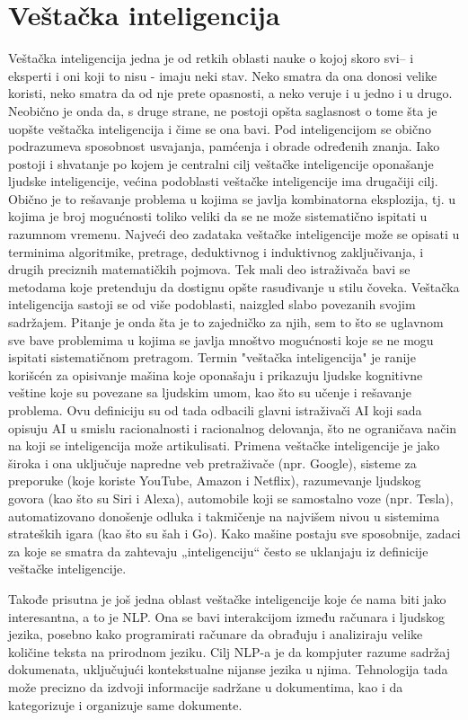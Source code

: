 \documentclass[a4paper]{article}
\begin{document}
\section{Veštačka inteligencija}
\label{Veštačka inteligencija}
Veštačka inteligencija jedna je od retkih oblasti nauke o kojoj skoro svi– i eksperti i oni koji to nisu - imaju neki stav. Neko smatra da ona donosi velike koristi, neko smatra da od nje prete opasnosti, a neko veruje i u jedno i u drugo. Neobično je onda da, s druge strane, ne postoji opšta saglasnost o tome šta je uopšte veštačka inteligencija i čime se ona bavi. Pod inteligencijom se obično podrazumeva sposobnost usvajanja, pamćenja i obrade određenih znanja. Iako postoji i shvatanje po kojem je centralni cilj veštačke inteligencije oponašanje ljudske inteligencije, većina podoblasti veštačke inteligencije ima drugačiji cilj. Obično je to rešavanje problema u kojima se javlja kombinatorna eksplozija, tj. u kojima je broj mogućnosti toliko veliki da se ne može sistematično ispitati u razumnom vremenu. Najveći deo zadataka veštačke inteligencije može se opisati u terminima algoritmike, pretrage, deduktivnog i induktivnog zaključivanja, i drugih preciznih matematičkih pojmova. Tek mali deo istraživača bavi se metodama koje pretenduju da dostignu opšte rasuđivanje u stilu čoveka. Veštačka inteligencija sastoji se od više podoblasti, naizgled slabo povezanih svojim sadržajem. Pitanje je onda šta je to zajedničko za njih, sem to što se uglavnom sve bave problemima u kojima se javlja mnoštvo mogućnosti koje se ne mogu ispitati sistematičnom pretragom. Termin "veštačka inteligencija" je ranije korišcén za opisivanje mašina koje oponašaju i prikazuju ljudske kognitivne veštine koje su povezane sa ljudskim umom, kao što su učenje i rešavanje problema. Ovu definiciju su od tada odbacili glavni istraživači AI koji sada opisuju AI u smislu racionalnosti i racionalnog delovanja, što ne ograničava način na koji se inteligencija može artikulisati.
\newpage
Primena veštačke inteligencije je jako široka i ona uključuje napredne veb pretraživače (npr. Google), sisteme za preporuke (koje koriste YouTube, Amazon i Netflix), razumevanje ljudskog govora (kao što su Siri i Alexa), automobile koji se samostalno voze (npr. Tesla), automatizovano donošenje odluka i takmičenje na najvišem nivou u sistemima strateških igara (kao što su šah i Go). Kako mašine postaju sve sposobnije, zadaci za koje se smatra da zahtevaju „inteligenciju“ često se uklanjaju iz definicije veštačke inteligencije.

Takođe prisutna je još jedna oblast veštačke inteligencije koje će nama biti jako interesantna, a to je NLP. Ona se bavi interakcijom između računara i ljudskog jezika, posebno kako programirati računare da obrađuju i analiziraju velike količine teksta na prirodnom jeziku. Cilj NLP-a je da kompjuter razume sadržaj dokumenata, uključujući kontekstualne nijanse jezika u njima. Tehnologija tada može precizno da izdvoji informacije  sadržane u dokumentima, kao i da kategorizuje i organizuje same dokumente\cite{2}.
\end{document}
